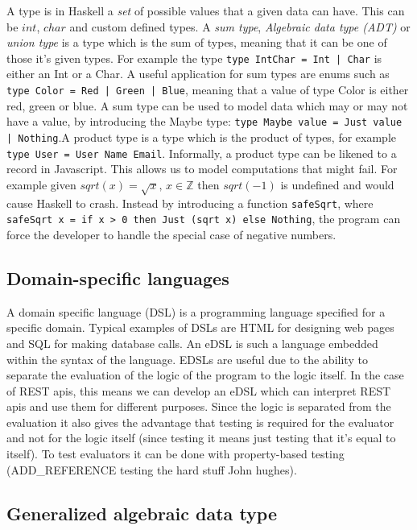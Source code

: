 A type is in Haskell a \textit{set} of possible values that a given data can
have. This can be $int$, $char$ and custom defined types. A \textit{sum type},
\textit{Algebraic data type (ADT)} or \textit{union type} is a type which is the
sum of types, meaning that it can be one of those it's given types. For example
the type \texttt{type IntChar = Int | Char} is either an Int or a Char. A useful
application for sum types are enums such as \texttt{type Color = Red | Green |
Blue}, meaning that a value of type Color is either red, green or blue. A sum
type can be used to model data which may or may not have a value, by introducing
the Maybe type: \texttt{type Maybe value = Just value | Nothing}.A product type
is a type which is the product of types, for example \texttt{type User = User
Name Email}.  Informally, a product type can be likened to a record in
Javascript.  This allows us to model computations that might fail. For example
given $sqrt(x) = \sqrt{x},\, x\in \mathbb{Z}$ then $sqrt(-1)$ is undefined and
would cause Haskell to crash.  Instead by introducing a function
\texttt{safeSqrt}, where \texttt{safeSqrt x = if x > 0 then Just (sqrt x) else
Nothing}, the program can force the developer to handle the special case of
negative numbers. 

\subsection{Domain-specific languages}

A domain specific language (DSL) is a programming language specified for a
specific domain. Typical examples of DSLs are HTML for designing web pages and
SQL for making database calls. An eDSL is such a language embedded within the
syntax of the language. EDSLs are useful due to the ability to separate the
evaluation of the logic of the program to the logic itself. In the case of REST
apis, this means we can develop an eDSL which can interpret REST apis and use
them for different purposes. Since the logic is separated from the evaluation it
also gives the advantage that testing is required for the evaluator and not for
the logic itself (since testing it means just testing that it's equal to
itself). To test evaluators it can be done with property-based testing
(ADD\_REFERENCE testing the hard stuff John hughes). 

\subsection{Generalized algebraic data type}\label{gadt}

